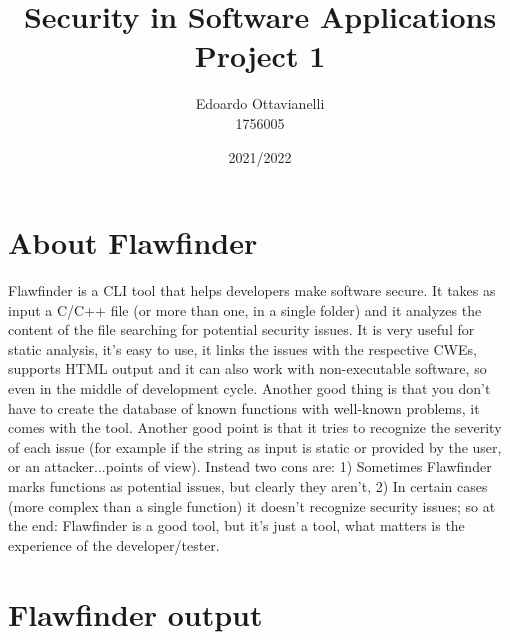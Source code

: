 \documentclass{article}
\title{Security in Software Applications \\ Project 1}
\author{Edoardo Ottavianelli \\ 1756005}
\date{2021/2022}
\begin{document}
\maketitle

\tableofcontents

\clearpage

\section{About Flawfinder}

Flawfinder is a CLI tool that helps developers make software secure. It takes as input a C/C++ file (or more than one, in a single folder) and it analyzes the content of the file searching for potential security issues. It is very useful for static analysis, it's easy to use, it links the issues with the respective CWEs, supports HTML output and it can also work with non-executable software, so even in the middle of development cycle. Another good thing is that you don’t have to create the database of known functions with well-known problems, it comes with the tool. Another good point is that it tries to recognize the severity of each issue (for example if the string as input is static or provided by the user, or an attacker...points of view). Instead two cons are: 1) Sometimes Flawfinder marks functions as potential issues, but clearly they aren't, 2) In certain cases (more complex than a single function) it doesn't recognize security issues; so at the end: Flawfinder is a good tool, but it's just a tool, what matters is the experience of the developer/tester. 

\section{Flawfinder output}
\end{document}
